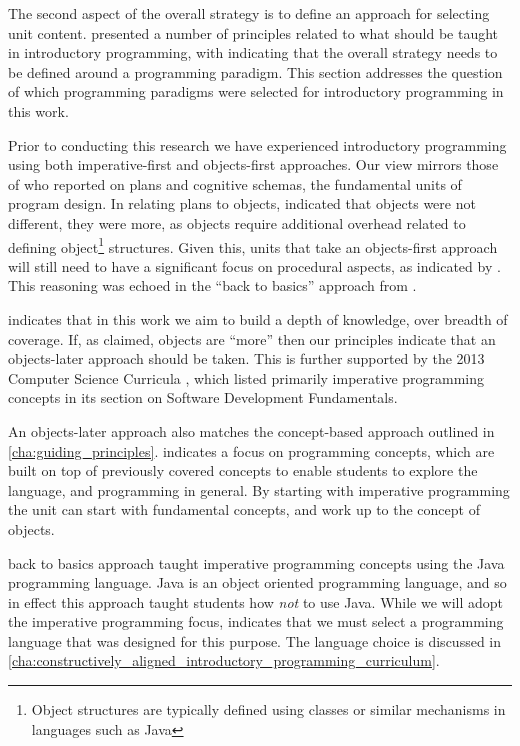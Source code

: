 The second aspect of the overall strategy is to define an approach for selecting unit content.  presented a number of principles related to what should be taught in introductory programming, with  indicating that the overall strategy needs to be defined around a programming paradigm. This section addresses the question of which programming paradigms were selected for introductory programming in this work.

Prior to conducting this research we have experienced introductory programming using both imperative-first and objects-first approaches. Our view mirrors those of \citet{Rist:1996} who reported on plans and cognitive schemas, the fundamental units of program design. In relating plans to objects, \citet{Rist:1996} indicated that objects were not different, they were more, as objects require additional overhead related to defining object\footnote{Object structures are typically defined using classes or similar mechanisms in languages such as Java} structures. Given this, units that take an objects-first approach will still need to have a significant focus on procedural aspects, as indicated by \citet{Robins:2003}. This reasoning was echoed in the ``back to basics'' approach from \citet{Reges:2006}.

 indicates that in this work we aim to build a depth of knowledge, over breadth of coverage. If, as \citet{Rist:1996} claimed, objects are ``more'' then our principles indicate that an objects-later approach should be taken. This is further supported by the 2013 Computer Science Curricula \cite{CSC2013}, which listed primarily imperative programming concepts in its section on Software Development Fundamentals.

An objects-later approach also matches the concept-based approach outlined in \cref{cha:guiding_principles}.  indicates a focus on programming concepts, which are built on top of previously covered concepts to enable students to explore the language, and programming in general. By starting with imperative programming the unit can start with fundamental concepts, and work up to the concept of objects.

\citet{Reges:2006} back to basics approach taught imperative programming concepts using the Java programming language. Java is an object oriented programming language, and so in effect this approach taught students how \emph{not} to use Java. While we will adopt the imperative programming focus,  indicates that we must select a programming language that was designed for this purpose. The language choice is discussed in \cref{cha:constructively_aligned_introductory_programming_curriculum}.


